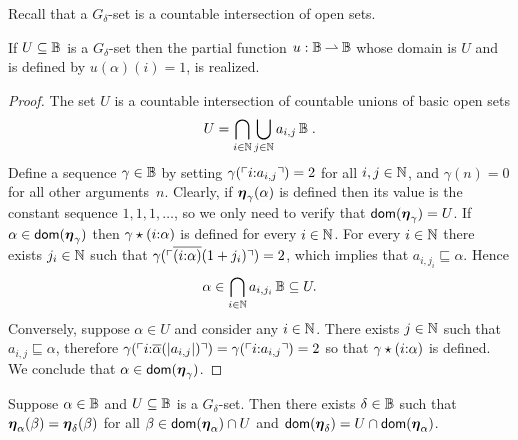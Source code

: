 %
%
Recall that a $G_\delta$-set is a countable intersection of open sets.

\begin{proposition}
  \label{th:G_delta_characteristic}%
  If $U \subseteq \mathbb{B}$ is a $G_\delta$-set then the partial
  function $u: \mathbb{B} \mathbin{\rightharpoonup} \mathbb{B}$ whose domain is $U$ and is
  defined by $u(\alpha)(i) = 1$, is realized.
\end{proposition}

\begin{proof}
  The set $U$ is a countable intersection of countable unions of basic
  open sets
  \begin{equation*}
    U = \bigcap_{i \in \mathbb{N}}
        \bigcup_{j \in \mathbb{N}} a_{i,j}\,\mathbb{B} \;.
  \end{equation*}
  Define a sequence $\gamma \in \mathbb{B}$ by setting
  $\gamma(\ulcorner i {:} a_{i,j} \urcorner) = 2$ for all $i, j \in \mathbb{N}$,
  and $\gamma(n) = 0$ for all other arguments~$n$. Clearly, if
  $\text{\boldmath{$\eta$}}_{\gamma}(\alpha)$ is defined then its value is the constant
  sequence $1, 1, 1, \ldots$, so we only need to verify that
  $\mathsf{dom}(\text{\boldmath{$\eta$}}_\gamma) = U$. If $\alpha \in \mathsf{dom}(\text{\boldmath{$\eta$}}_\gamma)$ then
  $\gamma \star (i {:} \alpha)$ is defined for every $i \in \mathbb{N}$.
  For every $i \in \mathbb{N}$ there exists $j_i \in \mathbb{N}$ such that $\gamma
  (\ulcorner \overline{(i {:} \alpha)}(1+j_i) \urcorner) = 2$, which implies that $
  a_{i, j_i} \sqsubseteq \alpha$. Hence
  \begin{equation*}
    \alpha \in \bigcap_{i \in \mathbb{N}} a_{i, j_i}\,\mathbb{B} \subseteq U.
  \end{equation*}
  Conversely, suppose $\alpha \in U$ and consider any $i \in \mathbb{N}$.
  There exists $j \in \mathbb{N}$ such that $a_{i,j} \sqsubseteq \alpha$,
  therefore $\gamma (\ulcorner i {:} \overline{\alpha}(|a_{i,j}|) \urcorner) =
  \gamma(\ulcorner i {:} a_{i,j} \urcorner) = 2$ so that $\gamma \star
  (i {:} \alpha)$ is defined. We conclude that $\alpha \in
  \mathsf{dom}(\text{\boldmath{$\eta$}}_\gamma)$.
\end{proof}

\begin{lemma}
  \label{th:restrict_G_delta}%
  Suppose $\alpha \in \mathbb{B}$ and $U \subseteq \mathbb{B}$ is a $G_\delta$-set.
  Then there exists $\delta \in \mathbb{B}$ such that $\text{\boldmath{$\eta$}}_{\alpha}(\beta) =
  \text{\boldmath{$\eta$}}_{\delta}(\beta)$ for all $\beta \in \mathsf{dom}(\text{\boldmath{$\eta$}}_\alpha) \cap U$ and
  $\mathsf{dom}(\text{\boldmath{$\eta$}}_\delta) = U \cap \mathsf{dom}(\text{\boldmath{$\eta$}}_\alpha)$.
\end{lemma}

